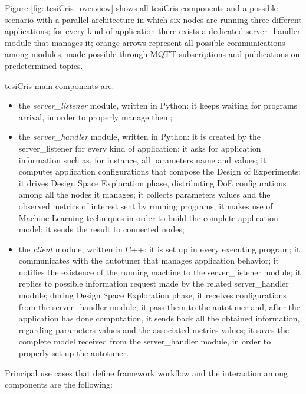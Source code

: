 Figure \ref{fig::tesiCris_overview} shows all tesiCris components and a possible scenario with a parallel architecture in which six nodes are running three different applications; for every kind of application there exists a dedicated server\_handler module that manages it; orange arrows represent all possible communications among modules, made possible through MQTT subscriptions and publications on predetermined topics.

tesiCris main components are:

\begin{itemize}

    \item the \textit{server\_listener} module, written in Python: it keeps waiting for programs arrival, in order to properly manage them;
    
    \item the \textit{server\_handler} module, written in Python: it is created by the server\_listener for every kind of application; it asks for application information such as, for instance, all parameters name and values; it computes application configurations that compose the Design of Experiments; it drives Design Space Exploration phase, distributing DoE configurations among all the nodes it manages; it collects parameters values and the observed metrics of interest sent by running programs; it makes use of Machine Learning techniques in order to build the complete application model; it sends the result to connected nodes;
    
    \item the \textit{client} module, written in C++: it is set up in every executing program; it communicates with the autotuner that manages application behavior; it notifies the existence of the running machine to the server\_listener module; it replies to possible information request made by the related server\_handler module; during Design Space Exploration phase, it receives configurations from the server\_handler module, it pass them to the autotuner and, after the application has done computation, it sends back all the obtained information, regarding parameters values and the associated metrics values; it saves the complete model received from the server\_handler module, in order to properly set up the autotuner.

\end{itemize}

Principal use cases that define framework workflow and the interaction among components are the following:

